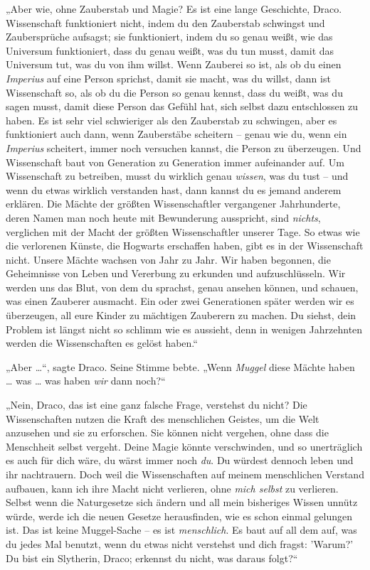 {„Aber wie, ohne Zauberstab und Magie? Es ist eine lange Geschichte, Draco. Wissenschaft funktioniert nicht, indem du den Zauberstab schwingst und Zaubersprüche aufsagst; sie funktioniert, indem du so genau weißt, wie das Universum funktioniert, dass du genau weißt, was du tun musst, damit das Universum tut, was du von ihm willst. Wenn Zauberei so ist, als ob du einen \emph{Imperius} auf eine Person sprichst, damit sie macht, was du willst, dann ist Wissenschaft so, als ob du die Person so genau kennst, dass du weißt, was du sagen musst, damit diese Person das Gefühl hat, sich selbst dazu entschlossen zu haben. Es ist sehr viel schwieriger als den Zauberstab zu schwingen, aber es funktioniert auch dann, wenn Zauberstäbe scheitern -- genau wie du, wenn ein \emph{Imperius} scheitert, immer noch versuchen kannst, die Person zu überzeugen. Und Wissenschaft baut von Generation zu Generation immer aufeinander auf. Um Wissenschaft zu betreiben, musst du wirklich genau \emph{wissen}, was du tust -- und wenn du etwas wirklich verstanden hast, dann kannst du es jemand anderem erklären. Die Mächte der größten Wissenschaftler vergangener Jahrhunderte, deren Namen man noch heute mit Bewunderung ausspricht, sind \emph{nichts}, verglichen mit der Macht der größten Wissenschaftler unserer Tage. So etwas wie die verlorenen Künste, die Hogwarts erschaffen haben, gibt es in der Wissenschaft nicht. Unsere Mächte wachsen von Jahr zu Jahr. Wir haben begonnen, die Geheimnisse von Leben und Vererbung zu erkunden und aufzuschlüsseln. Wir werden uns das Blut, von dem du sprachst, genau ansehen können, und schauen, was einen Zauberer ausmacht. Ein oder zwei Generationen später werden wir es überzeugen, all eure Kinder zu mächtigen Zauberern zu machen. Du siehst, dein Problem ist längst nicht so schlimm wie es aussieht, denn in wenigen Jahrzehnten werden die Wissenschaften es gelöst haben.“

„Aber …“, sagte Draco. Seine Stimme bebte. „Wenn \emph{Muggel} diese Mächte haben … was … was haben \emph{wir} dann noch?“

„Nein, Draco, das ist eine ganz falsche Frage, verstehst du nicht? Die Wissenschaften nutzen die Kraft des menschlichen Geistes, um die Welt anzusehen und sie zu erforschen. Sie können nicht vergehen, ohne dass die Menschheit selbst vergeht. Deine Magie könnte verschwinden, und so unerträglich es auch für dich wäre, du wärst immer noch \emph{du}. Du würdest dennoch leben und ihr nachtrauern. Doch weil die Wissenschaften auf meinem menschlichen Verstand aufbauen, kann ich ihre Macht nicht verlieren, ohne \emph{mich selbst} zu verlieren. Selbst wenn die Naturgesetze sich ändern und all mein bisheriges Wissen unnütz würde, werde ich die neuen Gesetze herausfinden, wie es schon einmal gelungen ist. Das ist keine Muggel-Sache -- es ist \emph{menschlich}. Es baut auf all dem auf, was du jedes Mal benutzt, wenn du etwas nicht verstehst und dich fragst: 'Warum?' Du bist ein Slytherin, Draco; erkennst du nicht, was daraus folgt?“

}
